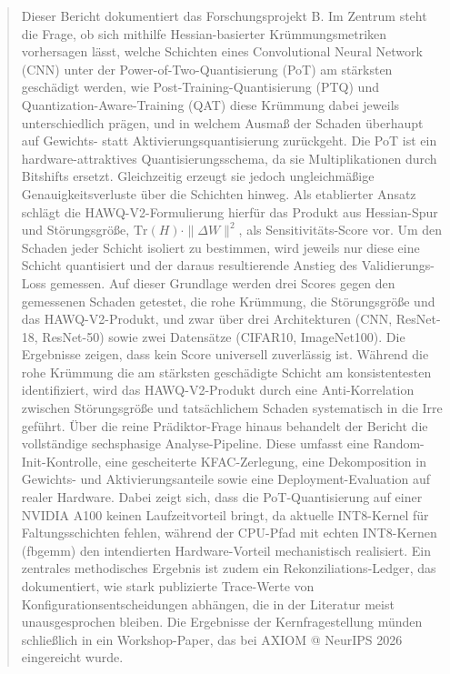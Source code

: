 \begin{abstract}
\noindent
Dieser Bericht dokumentiert das Forschungsprojekt B. Im Zentrum steht die Frage, ob sich mithilfe Hessian-basierter Krümmungsmetriken vorhersagen lässt, welche Schichten eines Convolutional Neural Network (CNN) unter der Power-of-Two-Quantisierung (PoT) am stärksten geschädigt werden, wie Post-Training-Quantisierung (PTQ) und Quantization-Aware-Training (QAT) diese Krümmung dabei jeweils unterschiedlich prägen, und in welchem Ausmaß der Schaden überhaupt auf Gewichts- statt Aktivierungsquantisierung zurückgeht. Die PoT ist ein hardware-attraktives Quantisierungsschema, da sie Multiplikationen durch Bitshifts ersetzt. Gleichzeitig erzeugt sie jedoch ungleichmäßige Genauigkeitsverluste über die Schichten hinweg. Als etablierter Ansatz schlägt die HAWQ-V2-Formulierung hierfür das Produkt aus Hessian-Spur und Störungsgröße, $\mathrm{Tr}(H)\cdot\|\Delta W\|^2$, als Sensitivitäts-Score vor. Um den Schaden jeder Schicht isoliert zu bestimmen, wird jeweils nur diese eine Schicht quantisiert und der daraus resultierende Anstieg des Validierungs-Loss gemessen. Auf dieser Grundlage werden drei Scores gegen den gemessenen Schaden getestet, die rohe Krümmung, die Störungsgröße und das HAWQ-V2-Produkt, und zwar über drei Architekturen (CNN, ResNet-18, ResNet-50) sowie zwei Datensätze (CIFAR10, ImageNet100). Die Ergebnisse zeigen, dass kein Score universell zuverlässig ist. Während die rohe Krümmung die am stärksten geschädigte Schicht am konsistentesten identifiziert, wird das HAWQ-V2-Produkt durch eine Anti-Korrelation zwischen Störungsgröße und tatsächlichem Schaden systematisch in die Irre geführt. Über die reine Prädiktor-Frage hinaus behandelt der Bericht die vollständige sechsphasige Analyse-Pipeline. Diese umfasst eine Random-Init-Kontrolle, eine gescheiterte KFAC-Zerlegung, eine Dekomposition in Gewichts- und Aktivierungsanteile sowie eine Deployment-Evaluation auf realer Hardware. Dabei zeigt sich, dass die PoT-Quantisierung auf einer NVIDIA A100 keinen Laufzeitvorteil bringt, da aktuelle INT8-Kernel für Faltungsschichten fehlen, während der CPU-Pfad mit echten INT8-Kernen (fbgemm) den intendierten Hardware-Vorteil mechanistisch realisiert. Ein zentrales methodisches Ergebnis ist zudem ein Rekonziliations-Ledger, das dokumentiert, wie stark publizierte Trace-Werte von Konfigurationsentscheidungen abhängen, die in der Literatur meist unausgesprochen bleiben. Die Ergebnisse der Kernfragestellung münden schließlich in ein Workshop-Paper, das bei AXIOM @ NeurIPS 2026 eingereicht wurde.
\end{abstract}